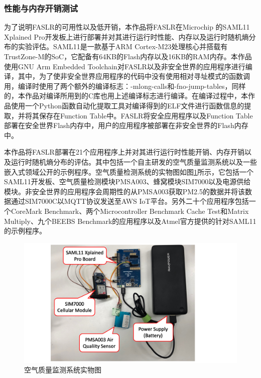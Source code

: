 \documentclass[UTF8,12pt,a4paper]{ctexart}
\numberwithin{figure}{section}
\begin{document}
\subsubsection{性能与内存开销测试}
\par 为了说明FASLR的可用性以及低开销，本作品将FASLR在Microchip 的SAML11 Xplained Pro开发板上进行部署并对其进行运行时性能、内存以及运行时随机熵分布的实验评估。SAML11是一款基于ARM Cortex-M23处理核心并搭载有TrustZone-M的SoC，它配备有64KB的Flash内存以及16KB的RAM内存。本作品使用GNU Arm Embedded Toolchain对FASLR以及非安全世界的应用程序进行编译，其中，为了使非安全世界应用程序的代码中没有使用相对寻址模式的函数调用，编译时使用了两个额外的编译标志：-mlong-calls和-fno-jump-tables，同样的，本作品对编译所用到的C库也用上述编译标志进行编译。在编译过程中，本作品使用一个Python函数自动化提取工具对编译得到的ELF文件进行函数信息的提取，并将其保存在Function Table中。FASLR将安全应用程序以及Function Table部署在安全世界Flash内存中，用户的应用程序被部署在非安全世界的Flash内存中。
\par 本作品将FASLR部署在21个应用程序上并对其进行运行时性能开销、内存开销以及运行时随机熵分布的评估。其中包括一个自主研发的空气质量监测系统以及一些嵌入式领域公开的示例程序。空气质量检测系统的实物图如图\ref{physicalDrawing}所示，它包括一个SAML11开发板、空气质量检测模块PMSA003、蜂窝模块SIM7000以及电源供给模块。非安全世界的应用程序会周期性的从PMSA003获取PM2.5的数据并将该数据通过SIM7000C以MQTT协议发送至AWS IoT平台。另外二十个应用程序包括一个CoreMark Benchmark\cite{CoreMarkBenchmark}、两个Microcontroller Benchmark Cache Test和Matrix Multiply、九个BEEBS Benchmark\cite{BEEBSBenchmark}的应用程序以及Atmel官方\cite{Atmel}提供的针对SAML11的示例程序。
\begin{figure}[H] %
    \label{physicalDrawing}
    \centering
    \includegraphics[scale=0.8]{graph/physicalDrawing.png}
    \caption{空气质量监测系统实物图}
\end{figure}
\end{document}
